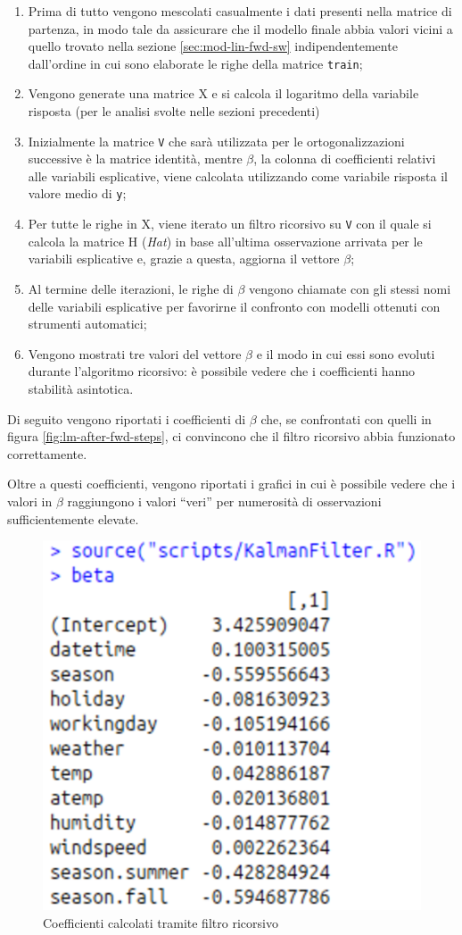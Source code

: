 \begin{enumerate}
\item Prima di tutto vengono mescolati casualmente i dati presenti nella
  matrice di partenza, in modo tale da assicurare che il modello finale abbia
  valori vicini a quello trovato nella sezione \ref{sec:mod-lin-fwd-sw}
  indipendentemente dall'ordine in cui sono elaborate le righe della matrice
  \texttt{train};
\item Vengono generate una matrice X e si calcola il logaritmo della variabile
  risposta (per le analisi svolte nelle sezioni precedenti)
\item Inizialmente la matrice \texttt{V} che sarà utilizzata per le
  ortogonalizzazioni successive è la matrice identità, mentre $ \beta{} $, la
  colonna di coefficienti relativi alle variabili esplicative, viene calcolata
  utilizzando come variabile risposta il valore medio di \texttt{y};
\item Per tutte le righe in X, viene iterato un filtro ricorsivo su \texttt{V}
  con il quale si calcola la matrice H (\emph{Hat}) in base all'ultima
  osservazione arrivata per le variabili esplicative e, grazie a questa,
  aggiorna il vettore $ \beta{} $;
\item Al termine delle iterazioni, le righe di $ \beta{} $ vengono chiamate
  con gli stessi nomi delle variabili esplicative per favorirne il confronto
  con modelli ottenuti con strumenti automatici;
\item Vengono mostrati tre valori del vettore $ \beta{} $ e il modo in cui essi
  sono evoluti durante l'algoritmo ricorsivo: è possibile vedere che i
  coefficienti hanno stabilità asintotica.
\end{enumerate}

Di seguito vengono riportati i coefficienti di $ \beta{} $ che, se confrontati
con quelli in figura \ref{fig:lm-after-fwd-steps}, ci convincono che il filtro
ricorsivo abbia funzionato correttamente.

Oltre a questi coefficienti, vengono riportati i grafici in cui è possibile
vedere che i valori in $ \beta{} $ raggiungono i valori ``veri'' per numerosità
di osservazioni sufficientemente elevate.

\begin{figure}[H]
  \centering
  \includegraphics[width=.55\columnwidth]{images/kalman-beta.eps}
  \caption{Coefficienti calcolati tramite filtro ricorsivo}
    \label{fig:kalman-beta}
\end{figure}

